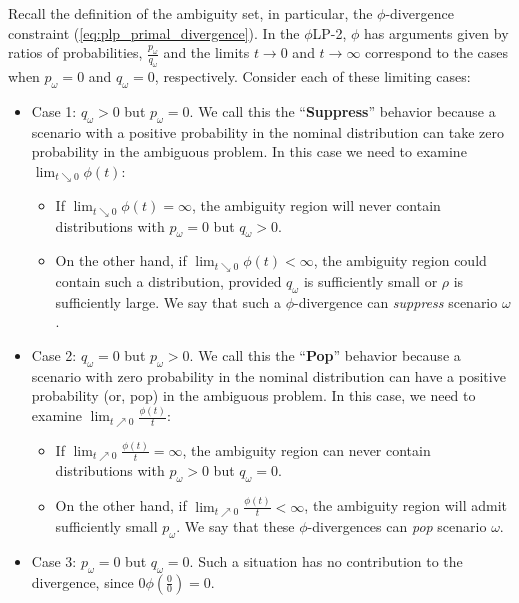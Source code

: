 \documentclass[12pt]{article}
\theoremstyle{plain}
\theoremstyle{definition}
\theoremstyle{remark}
\newcommand{\plp}{$\phi$LP-2}
\begin{document}
Recall the definition of the ambiguity set, in particular, the $\phi$-divergence constraint (\ref{eq:plp_primal_divergence}). 
In the \plp, $\phi$ has arguments given by ratios of probabilities, $\tfrac{p_\omega}{q_\omega}$ and the limits $t \rightarrow 0$ and $t \rightarrow \infty$ correspond to the cases when $p_\omega = 0$ and $q_\omega = 0$, respectively.
Consider each of these limiting cases:
\begin{itemize}
	\item {\sc Case 1:} $q_\omega > 0$ but $p_\omega = 0$.
		We call this the ``{\bf Suppress}'' behavior because a scenario with a positive probability in the nominal distribution can take zero probability in the ambiguous problem. In this case we need to examine $\lim_{t \searrow 0} \phi(t)$:
	\begin{itemize}
		\item If $\lim_{t \searrow 0} \phi(t) = \infty$, the ambiguity region will never contain distributions with $p_\omega = 0$ but $q_\omega > 0$.
		\item On the other hand, if $\lim_{t \searrow 0} \phi(t) < \infty$, the ambiguity region could contain such a distribution, provided $q_\omega$ is sufficiently small or $\rho$ is sufficiently large.
			We say that such a $\phi$-divergence can \emph{suppress} scenario $\omega$.
	\end{itemize}
	\item {\sc Case 2:} $q_\omega = 0$ but $p_\omega > 0$.
		We call this the ``{\bf Pop}'' behavior because a scenario with zero probability in the nominal distribution can have a positive probability (or, pop) in the ambiguous problem. In this case, we need to examine $\lim_{t \nearrow 0} \frac{\phi(t)}{t}$:
	\begin{itemize}
		\item If $\lim_{t \nearrow 0} \frac{\phi(t)}{t} = \infty$, the ambiguity region can never contain distributions with $p_\omega > 0$ but $q_\omega = 0$.
		\item On the other hand, if $\lim_{t \nearrow 0} \frac{\phi(t)}{t} < \infty$, the ambiguity region will admit sufficiently small $p_\omega$.
			We say that these $\phi$-divergences can \emph{pop} scenario $\omega$.
	\end{itemize}
	\item {\sc Case 3:} $p_\omega = 0$ but $q_\omega = 0$.
		Such a situation has no contribution to the divergence, since $0 \phi\left(\tfrac{0}{0}\right) = 0$.
\end{itemize}
\end{document}
